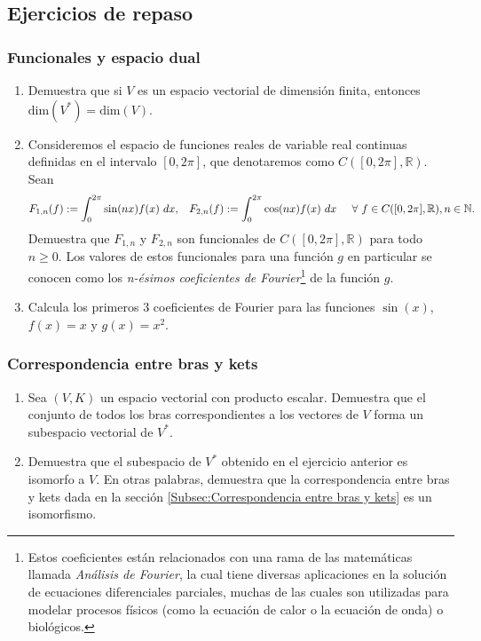 \documentclass[12pt,libertine]{book}
\begin{document}
\subsection*{Ejercicios de repaso} \label{}

\subsubsection*{Funcionales y espacio dual} \label{Ejer:Funcionales_y_espacio_dual}
\begin{enumerate}
    \item Demuestra que si $V$ es un espacio vectorial de dimensión finita, entonces $\text{dim}(V^*)=\text{dim}(V)$.
    \item Consideremos el espacio de funciones reales de variable real continuas definidas en el intervalo $[0,2\pi]$, que denotaremos como $C([0,2\pi],\mathbb{R})$. Sean \[
            F_{1,n}(f):=\int_0^{2\pi} \sin(nx)f(x) \ dx, \hspace{3mm} F_{2,n}(f):=\int_0^{2\pi} \cos(nx)f(x) \ dx \hspace{5mm} \forall \ f\in C([0,2\pi],\mathbb{R}), n\in\mathbb{N}.
        \] Demuestra que $F_{1,n}$ y $F_{2,n}$ son funcionales de $C([0,2\pi],\mathbb{R})$ para todo $n\ge 0$. Los valores de estos funcionales para una función $g$ en particular se conocen como los \emph{n-ésimos coeficientes de Fourier}\footnote{Estos coeficientes están relacionados con una rama de las matemáticas llamada \emph{Análisis de Fourier}, la cual tiene diversas aplicaciones en la solución de ecuaciones diferenciales parciales, muchas de las cuales son utilizadas para modelar procesos físicos (como la ecuación de calor o la ecuación de onda) o biológicos.} de la función $g$.
    \item Calcula los primeros 3 coeficientes de Fourier para las funciones $\sin(x)$, $f(x)=x$ y $g(x)=x^2$.
\end{enumerate}

\subsubsection*{Correspondencia entre bras y kets} \label{Ejer:Correspondencia_entre_bras_y_kets}
\begin{enumerate}
    \item Sea $(V,K)$ un espacio vectorial con producto escalar. Demuestra que el conjunto de todos los bras correspondientes a los vectores de $V$ forma un subespacio vectorial de $V^*$.
    \item Demuestra que el subespacio de $V^*$ obtenido en el ejercicio anterior es isomorfo a $V$. En otras palabras, demuestra que la correspondencia entre bras y kets dada en la sección \ref{Subsec:Correspondencia entre bras y kets} es un isomorfismo.
\end{enumerate}
\end{document}
